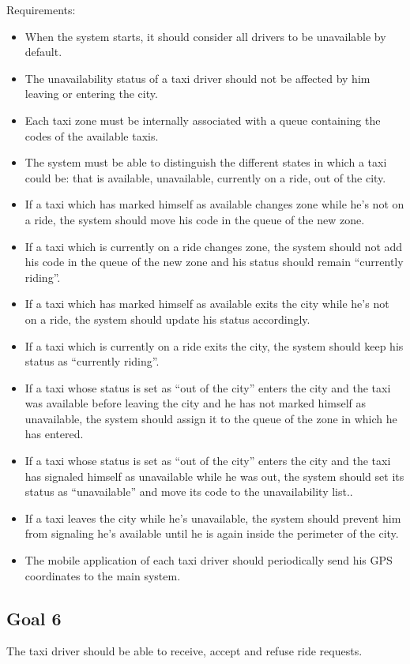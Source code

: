 Requirements:
\begin{itemize}
\item When the system starts, it should consider all drivers to be unavailable by default.
\item The unavailability status of a taxi driver should not be affected by him leaving or entering the city.
\item Each taxi zone must be internally associated with a queue containing the codes of the available taxis.
\item The system must be able to distinguish the different states in which a taxi could be: that is available, unavailable, currently on a ride, out of the city.
\item If a taxi which has marked himself as available changes zone while he's not on a ride, the system should move his code in the queue of the new zone.
\item If a taxi which is currently on a ride changes zone, the system should not add his code in the queue of the new zone and his status should remain ``currently riding''.
\item If a taxi which has marked himself as available exits the city while he's not on a ride, the system should update his status accordingly.
\item If a taxi which is currently on a ride exits the city, the system should keep his status as ``currently riding''. 
\item If a taxi whose status is set as ``out of the city'' enters the city and the taxi was available before leaving the city and he has not marked himself as unavailable, the system should assign it to the queue of the zone in which he has entered.
\item If a taxi whose status is set as ``out of the city'' enters the city and the taxi has signaled himself as unavailable while he was out, the system should set its status as ``unavailable'' and move its code to the unavailability list.. 
\item If a taxi leaves the city while he's unavailable, the system should prevent him from signaling he's available until he is again inside the perimeter of the city.
\item The mobile application of each taxi driver should periodically send his GPS coordinates to the main system. 
\end{itemize}


\subsection{Goal 6}
The taxi driver should be able to receive, accept and refuse ride requests.

